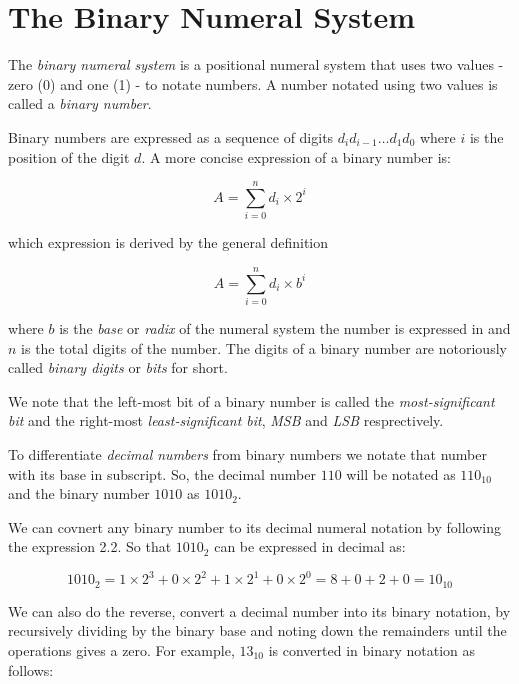 \section{The Binary Numeral System}

The \textit{binary numeral system} is a positional numeral system that uses two values -
zero (0) and one (1) - to notate numbers. A number notated using two values is called
a \textit{binary number}.

Binary numbers are expressed as a sequence of digits $d_id_{i-1}\ldots d_1d_0$
where $i$ is the position of the digit $d$. A more concise expression of
a binary number is:

\begin{equation}
    A=\sum_{i=0}^{n}d_i\times2^i
\end{equation}

which expression is derived by the general definition

\begin{equation}
    A=\sum_{i=0}^{n}d_i\times b^i
\end{equation}

where $b$ is the \textit{base} or \textit{radix} of the numeral system the
number is expressed in and $n$ is the total digits of the number. The digits
of a binary number are notoriously called \textit{binary digits} or \textit{bits}
for short.

We note that the left-most bit of a binary number is called the \textit{most-significant bit}
and the right-most \textit{least-significant bit}, \textit{MSB} and \textit{LSB} resprectively.

To differentiate \textit{decimal numbers} from binary numbers we notate that
number with its base in subscript. So, the decimal number $110$ will be
notated as $110_{10}$ and the binary number $1010$ as $1010_2$.

We can covnert any binary number to its decimal numeral notation by
following the expression 2.2. So that $1010_2$ can be expressed in decimal as:

\begin{equation}
    1010_2 = 1 \times 2^3 + 0 \times 2^2 + 1 \times 2^1  + 0 \times 2^0 = 8 + 0 + 2 + 0 = 10_{10}
\end{equation}

We can also do the reverse, convert a decimal number into its binary notation, by recursively
dividing by the binary base and noting down the remainders until the operations gives a zero.
For example, $13_{10}$ is converted in binary notation as follows:

